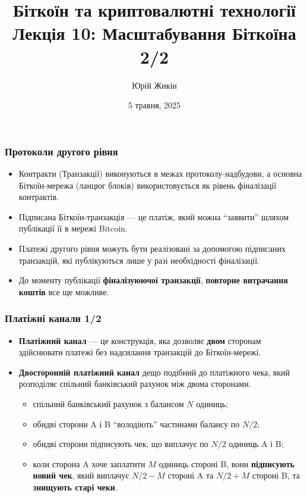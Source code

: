 \documentclass{beamer}
\title{
  Біткоїн та криптовалютні технології \\
  Лекція 10: Масштабування Біткоїна 2/2
}
\author{Юрій Жикін}
\date{5 травня, 2025}
\begin{document}
\frame{\titlepage}

\begin{frame}
  \frametitle{Протоколи другого рівня}
  \begin{itemize}
  \item Контракти (Транзакції) виконуються в межах протоколу-надбудови, а
    основна Біткоїн-мережа (ланцюг блоків) використовується як рівень
    фіналізації контрактів.
  \item Підписана Біткоїн-транзакція — це платіж, який можна ``заявити'' шляхом
    публікації її в мережі Bitcoin.
  \item Платежі другого рівня можуть бути реалізовані за допомогою підписаних
    транзакцій, які публікуються лише у разі необхідності фіналізації.
  \item До моменту публікації \textbf{фіналізуюючої транзакції},
    \textbf{повторне витрачання коштів} все ще можливе.
  \end{itemize}
\end{frame}

\begin{frame}
  \frametitle{Платіжні канали 1/2}
  \begin{itemize}
  \item \textbf{Платіжний канал} — це конструкція, яка дозволяє \textbf{двом}
    сторонам здійснювати платежі без надсилання транзакцій до Біткоїн-мережі.
  \item \textbf{Двосторонній платіжний канал} дещо подібний до платіжного
    чека, який розподіляє спільний банківський рахунок між двома сторонами.
    \begin{itemize}
    \item спільний банківський рахунок з балансом $N$ одиниць;
    \item обидві сторони A і B ``володіють'' частинами балансу по $N/2$;
    \item обидві сторони підписують чек, що виплачує по $N/2$ одиниць A і B;
    \item коли сторона A хоче заплатити $M$ одиниць стороні B, вони
      \textbf{підписують новий чек}, який виплачує $N/2 - M$ стороні A та
      $N/2 + M$ стороні B, та \textbf{знищують старі чеки}.
    \end{itemize}
  \end{itemize}
\end{frame}
\end{document}
